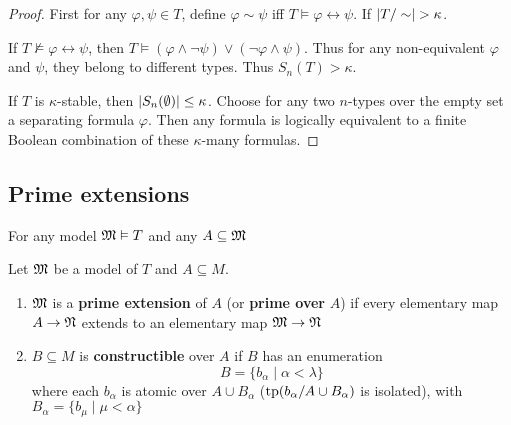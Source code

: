 \documentclass[11pt]{article}
\begin{document}
\begin{proof}
First for any \(\varphi,\psi\in T\), define \(\varphi\sim\psi\) iff \(T\vDash\varphi\leftrightarrow\psi\). If \(\abs{T/\sim}>\kappa\).

If \(T\not\vDash\varphi\leftrightarrow\psi\), then \(T\vDash(\varphi\wedge\neg\psi)\vee(\neg\varphi\wedge\psi)\). Thus for any non-equivalent \(\varphi\) and \(\psi\), they belong to
different types. Thus \(S_n(T)>\kappa\).

If \(T\) is \(\kappa\)-stable, then \(\abs{S_n(\emptyset)}\le\kappa\). Choose for any two \(n\)-types over the empty set
a separating formula \(\varphi\). Then any formula is logically equivalent to a finite Boolean combination
of these \(\kappa\)-many formulas.
\end{proof}

\subsection{Prime extensions}
\label{sec:org5e5e317}
For any model \(\mathfrak{M}\vDash T\) and any \(A\subseteq\mathfrak{M}\)

  \begin{center}\end{center}


\begin{definition}[]
Let \(\mathfrak{M}\) be a model of \(T\) and \(A\subseteq M\).
\begin{enumerate}
\item \(\mathfrak{M}\) is a \textbf{prime extension} of \(A\) (or \textbf{prime over} \(A\)) if every elementary map \(A\to\mathfrak{N}\)
extends to an elementary map \(\mathfrak{M}\to\mathfrak{N}\)
\begin{center}\end{center}
\item \(B\subseteq M\) is \textbf{constructible} over \(A\) if \(B\) has an enumeration
\begin{equation*}
B=\{b_\alpha\mid\alpha<\lambda\}
\end{equation*}
where each \(b_\alpha\) is atomic over \(A\cup B_\alpha\) (\(\operatorname{tp}(b_\alpha/A\cup B_\alpha)\) is isolated), with \(B_\alpha=\{b_\mu\mid \mu<\alpha\}\)
\end{enumerate}
\end{definition}
\end{document}

